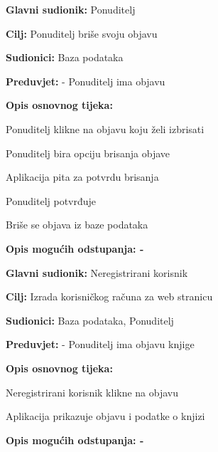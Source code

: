                     \noindent {}
					\begin{packed_item}
	
						\item \textbf{Glavni sudionik: } Ponuditelj
						\item  \textbf{Cilj:} Ponuditelj briše svoju objavu
						\item  \textbf{Sudionici:} Baza podataka
						\item  \textbf{Preduvjet:} - Ponuditelj ima objavu
						\item  \textbf{Opis osnovnog tijeka:}
						
						\item[] \begin{packed_enum}
	
							\item Ponuditelj klikne na objavu koju želi izbrisati
                            \item Ponuditelj bira opciju brisanja objave
							\item Aplikacija pita za potvrdu brisanja
                            \item Ponuditelj potvrđuje
                            \item Briše se objava iz baze podataka
						\end{packed_enum}
						
						\item  \textbf{Opis mogućih odstupanja: -}
					\end{packed_item}

                    \noindent {}
					\begin{packed_item}
	
						\item \textbf{Glavni sudionik: } Neregistrirani korisnik
						\item  \textbf{Cilj:} Izrada korisničkog računa za web stranicu
						\item  \textbf{Sudionici:} Baza podataka, Ponuditelj
						\item  \textbf{Preduvjet:} - Ponuditelj ima objavu knjige
						\item  \textbf{Opis osnovnog tijeka:}
						
						\item[] \begin{packed_enum}
	
							\item Neregistrirani korisnik klikne na objavu
                            \item Aplikacija prikazuje objavu i podatke o knjizi
						\end{packed_enum}
						
						\item  \textbf{Opis mogućih odstupanja: -}
					\end{packed_item}

